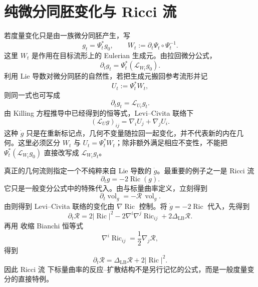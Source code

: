 \section{纯微分同胚变化与 Ricci 流}

若度量变化只是由一族微分同胚产生，写
\[
g_t=\Psi_t^*g_0,
\qquad
W_t:=\partial_t\Psi_t\circ\Psi_t^{-1}.
\]
这里 $W_t$ 是作用在目标流形上的 Eulerian 生成元。由拉回微分公式，
\[
\partial_tg_t
=\Psi_t^*(\mathcal L_{W_t}g_0).
\]
利用 Lie 导数对微分同胚的自然性，若把生成元搬回参考流形并记
\[
U_t:=\Psi_t^*W_t,
\]
则同一式也可写成
\begin{equation*}{\partial_tg_t=\mathcal L_{U_t}g_t.}
\end{equation*}
由 Killing 方程推导中已经得到的恒等式，Levi--Civita 联络下
\begin{equation*}(\mathcal L_Ug)_{ij}
=\nabla_iU_j+\nabla_jU_i.
\end{equation*}
这种 $\dot g$ 只是在重新标记点，几何不变量随拉回一起变化，并不代表新的内在几何。这里必须区分 $W_t$ 与 $U_t=\Psi_t^*W_t$；除非额外满足相应不变性，不能把 $\Psi_t^*(\mathcal L_{W_t}g_0)$ 直接改写成 $\mathcal L_{W_t}g_t$。

真正的几何流则指定一个不纯粹来自 Lie 导数的 $\dot g$。最重要的例子之一是 Ricci 流
\begin{equation*}\partial_tg=-2\operatorname{Ric}(g).
\end{equation*}
它只是一般变分公式中的特殊代入。由与标量曲率定义，立刻得到
\begin{equation}\label{eq:math-dg-ricci-flow-volume}
\partial_t\operatorname{vol}_g
=-\mathcal R\,\operatorname{vol}_g.
\end{equation}
由则得到 Levi--Civita 联络的变化由 $\nabla\operatorname{Ric}$ 控制。将 $\dot g=-2\operatorname{Ric}$ 代入，先得到
\[
\partial_t\mathcal R
=2|\operatorname{Ric}|^2
-2\nabla^i\nabla^j\operatorname{Ric}_{ij}
+2\Delta_{\mathrm{LB}}\mathcal R.
\]
再用 收缩 Bianchi 恒等式
\[
\nabla^i\operatorname{Ric}_{ij}=\frac12\nabla_j\mathcal R,
\]
得到
\begin{equation}\label{eq:math-dg-ricci-flow-scalar-curvature}
{
\partial_t\mathcal R
=\Delta_{\mathrm{LB}}\mathcal R+2|\operatorname{Ric}|^2.}
\end{equation}
因此 Ricci 流 下标量曲率的反应--扩散结构不是另行记忆的公式，而是一般度量变分的直接特例。


